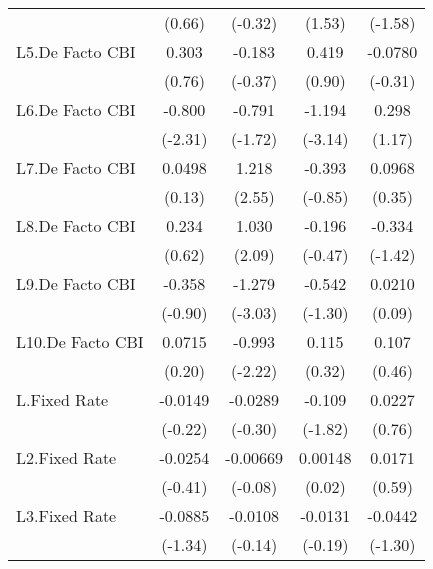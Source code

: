 {\begin{longtable}{l*{4}{c}}
                &   (0.66)         &  (-0.32)         &   (1.53)         &  (-1.58)         \\
[1em]
L5.De Facto CBI &    0.303         &   -0.183         &    0.419         &  -0.0780         \\
                &   (0.76)         &  (-0.37)         &   (0.90)         &  (-0.31)         \\
[1em]
L6.De Facto CBI &   -0.800\sym{*}  &   -0.791         &   -1.194\sym{**} &    0.298         \\
                &  (-2.31)         &  (-1.72)         &  (-3.14)         &   (1.17)         \\
[1em]
L7.De Facto CBI &   0.0498         &    1.218\sym{*}  &   -0.393         &   0.0968         \\
                &   (0.13)         &   (2.55)         &  (-0.85)         &   (0.35)         \\
[1em]
L8.De Facto CBI &    0.234         &    1.030\sym{*}  &   -0.196         &   -0.334         \\
                &   (0.62)         &   (2.09)         &  (-0.47)         &  (-1.42)         \\
[1em]
L9.De Facto CBI &   -0.358         &   -1.279\sym{**} &   -0.542         &   0.0210         \\
                &  (-0.90)         &  (-3.03)         &  (-1.30)         &   (0.09)         \\
[1em]
L10.De Facto CBI&   0.0715         &   -0.993\sym{*}  &    0.115         &    0.107         \\
                &   (0.20)         &  (-2.22)         &   (0.32)         &   (0.46)         \\
[1em]
L.Fixed Rate    &  -0.0149         &  -0.0289         &   -0.109         &   0.0227         \\
                &  (-0.22)         &  (-0.30)         &  (-1.82)         &   (0.76)         \\
[1em]
L2.Fixed Rate   &  -0.0254         & -0.00669         &  0.00148         &   0.0171         \\
                &  (-0.41)         &  (-0.08)         &   (0.02)         &   (0.59)         \\
[1em]
L3.Fixed Rate   &  -0.0885         &  -0.0108         &  -0.0131         &  -0.0442         \\
                &  (-1.34)         &  (-0.14)         &  (-0.19)         &  (-1.30)         \\

\end{longtable}}
